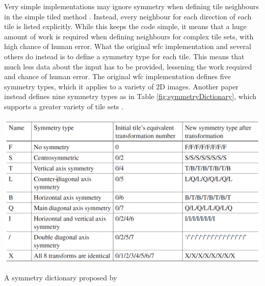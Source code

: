 Very simple implementations may ignore symmetry when defining tile neighbours in the simple tiled method \cite{Easy_WFC}. Instead, every neighbour for each direction of each tile is listed explicitly. While this keeps the code simple, it means that a huge amount of work is required when defining neighbours for complex tile sets, with high chance of human error. What the original \acrshort{wfc} implementation and several others do instead is to define a symmetry type for each tile. This means that much less data about the input has to be provided, lessening the work required and chance of human error. The original \acrshort{wfc} implementation defines five symmetry types, which it applies to a variety of 2D images. Another paper instead defines nine symmetry types as in Table \ref{fig:symmetryDictionary}, which supports a greater variety of tile sets \cite{WFC_Automatic_Rules_And_Better_Symmetries}.

\begin{table}[H]
    \centering
    \includegraphics[width=\textwidth, height=0.3\textheight, keepaspectratio]{Images/SymmetryDictionary.png}
    \caption{A symmetry dictionary proposed by \cite{WFC_Automatic_Rules_And_Better_Symmetries}}
    \label{fig:symmetryDictionary}
\end{table}

